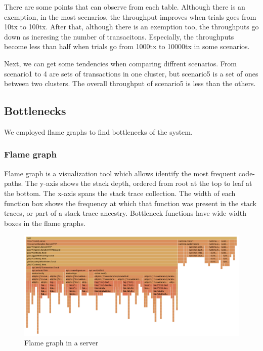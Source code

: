\documentclass[a4paper, oneside]{discothesis}
\begin{document}
There are some points that can observe from each table.
Although there is an exemption, in the most scenarios, the throughput improves
when trials goes from 10tx to 100tx.
After that, although there is an exemption too, the throughputs go down as incresing
the number of transacitons.
Especially, the throughputs become less than half when trials go from 1000tx to 10000tx
in some scenarios.

Next, we can get some tendencies when comparing diffrent scenarios.
From scenario1 to 4 are sets of transactions in one cluster,
but scenario5 is a set of ones between two clusters.
The overall throughput of scenario5 is less than the others.



\subsection{Bottlenecks}
We employed flame graphs to find bottlenecks of the system.

\subsubsection{Flame graph}
Flame graph is a visualization tool which allows identify the most frequent code-paths.
The y-axis shows the stack depth, ordered from root at the top to leaf at the bottom.
The x-axis spans the stack trace collection.
The width of each function box shows the frequency at which that function was present
in the stack traces, or part of a stack trace ancestry.
Bottleneck functions have wide width boxes in the flame graphs.


\begin{figure}
    \begin{center}
        \includegraphics[width=\columnwidth]{figures/server_flame_graph}
        \caption{Flame graph in a server}
        \label{fig:server-fg}
    \end{center}
\end{figure}
\end{document}
